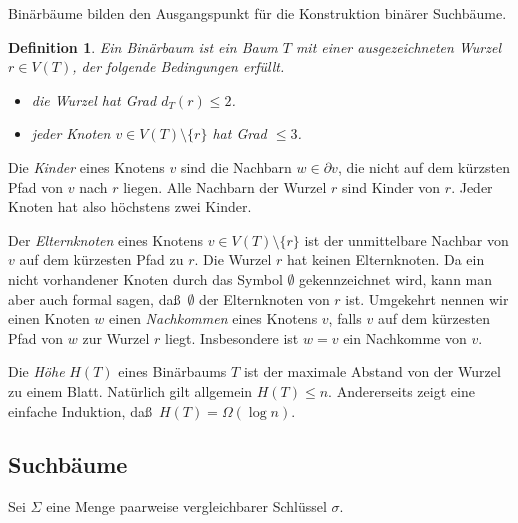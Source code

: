 \documentclass[10pt,reqno]{amsart}
\numberwithin{equation}{section}
\newcommand\alert[1]{\emph{#1}}
\newtheorem{definition}{Definition}[section]
\begin{document}
Bin\"arb\"aume bilden den Ausgangspunkt f\"ur die Konstruktion bin\"arer Suchb\"aume.

\begin{definition}\label{def_binary_tree}
	Ein \emph{Bin\"arbaum} ist ein Baum $T$ mit einer ausgezeichneten \emph{Wurzel} $r\in V(T)$, der folgende Bedingungen erf\"ullt.
\begin{itemize}
			\item die Wurzel hat Grad $d_T(r)\leq2$.
			\item jeder Knoten $v\in V(T)\setminus\{r\}$ hat Grad $\leq3$.
		\end{itemize}
\end{definition}

Die \alert{Kinder} eines Knotens $v$ sind die Nachbarn $w\in\partial v$, die nicht auf dem k\"urzsten Pfad von $v$ nach $r$ liegen. 
Alle Nachbarn der Wurzel $r$ sind Kinder von $r$.
Jeder Knoten hat also h\"ochstens zwei Kinder.

Der \alert{Elternknoten} eines Knotens $v\in V(T)\setminus\{r\}$ ist der unmittelbare Nachbar von $v$ auf dem k\"urzesten Pfad zu $r$.
Die Wurzel $r$ hat keinen Elternknoten.
Da ein nicht vorhandener Knoten durch das Symbol $\emptyset$ gekennzeichnet wird, kann man aber auch formal sagen, da\ss\ $\emptyset$ der Elternknoten von $r$ ist.
Umgekehrt nennen wir einen Knoten $w$ einen \emph{Nachkommen} eines Knotens $v$, falls $v$ auf dem k\"urzesten Pfad von $w$ zur Wurzel $r$ liegt.
Insbesondere ist $w=v$ ein Nachkomme von $v$.

Die \emph{H\"ohe} $H(T)$ eines Bin\"arbaums $T$ ist der maximale Abstand von der Wurzel zu einem Blatt.
Nat\"urlich gilt allgemein $H(T)\leq n$.
Andererseits zeigt eine einfache Induktion, da\ss\ $H(T)=\Omega(\log n)$.

\subsection{Suchb\"aume}\label{sec_search_trees}

Sei $\Sigma$ eine Menge paarweise vergleichbarer Schl\"ussel $\sigma$.
\end{document}
